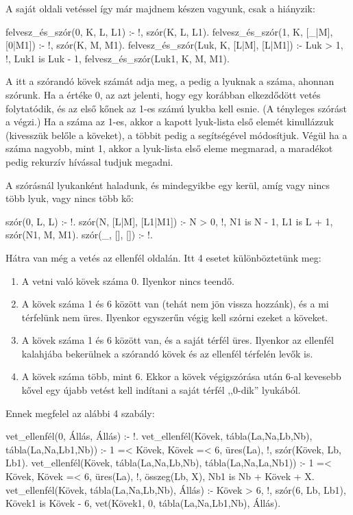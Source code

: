 A saját oldali vetéssel így már majdnem készen
vagyunk, csak a  hiányzik:
\begin{program}
felvesz_és_szór(0, K, L, L1) :- %
    !, szór(K, L, L1).
felvesz_és_szór(1, K, [_|M], [0|M1]) :-
    !, szór(K, M, M1).
felvesz_és_szór(Luk, K, [L|M], [L|M1]) :-
    Luk > 1, !, Luk1 is Luk - 1,
    felvesz_és_szór(Luk1, K, M, M1).
\end{program}

A  itt a szórandó kövek számát adja meg, a
 pedig a lyuknak a száma, ahonnan
szórunk. Ha a  értéke 0, az azt jelenti,
hogy egy korábban elkezdődött vetés folytatódik, és
az első kőnek az 1-es számú lyukba kell esnie. (A
tényleges szórást a  végzi.) Ha a 
száma az 1-es, akkor a kapott lyuk-lista első elemét
kinullázzuk (kivesszük belőle a köveket), a többit
pedig a  segítségével módosítjuk. Végül ha
a  száma nagyobb, mint 1, akkor a lyuk-lista
első eleme megmarad, a maradékot pedig rekurzív
hívással tudjuk megadni.

A szórásnál lyukanként haladunk, és mindegyikbe egy
kerül, amíg vagy nincs több lyuk, vagy nincs több
kő:
\begin{program}
szór(0, L, L) :- !.
szór(N, [L|M], [L1|M1]) :-
    N > 0, !,
    N1 is N - 1, L1 is L + 1,
    szór(N1, M, M1).
szór(_, [], []) :- !.
\end{program}

Hátra van még a vetés az ellenfél oldalán. Itt 4
esetet különböztetünk meg:
\begin{enumerate}
\item A vetni való kövek száma 0. Ilyenkor nincs
  teendő.
\item A kövek száma 1 és 6 között van (tehát nem jön
  vissza hozzánk), és a mi térfelünk nem
  üres. Ilyenkor egyszerűn végig kell szórni ezeket
  a köveket.
\item A kövek száma 1 és 6 között van, és a saját
  térfél üres. Ilyenkor az ellenfél kalahjába
  bekerülnek a szórandó kövek és az ellenfél
  térfelén levők is.
\item A kövek száma több, mint 6. Ekkor a kövek
  végigszórása után 6-al kevesebb kővel egy újabb
  vetést kell indítani a saját térfél ,,0-dik''
  lyukából.
\end{enumerate}

Ennek megfelel az alábbi 4 szabály:
\begin{program}
vet_ellenfél(0, Állás, Állás) :- !.
vet_ellenfél(Kövek, tábla(La,Na,Lb,Nb),
             tábla(La,Na,Lb1,Nb)) :-
    1 =< Kövek, Kövek =< 6,
    \+ üres(La), !,
    szór(Kövek, Lb, Lb1).
vet_ellenfél(Kövek, tábla(La,Na,Lb,Nb),
             tábla(La,Na,La,Nb1)) :-
    1 =< Kövek, Kövek =< 6,
    üres(La), !,
    összeg(Lb, X), Nb1 is Nb + Kövek + X.
vet_ellenfél(Kövek, tábla(La,Na,Lb,Nb), Állás) :-
    Kövek > 6, !,
    szór(6, Lb, Lb1),
    Kövek1 is Kövek - 6,
    vet(Kövek1, 0, tábla(La,Na,Lb1,Nb), Állás).
\end{program}

